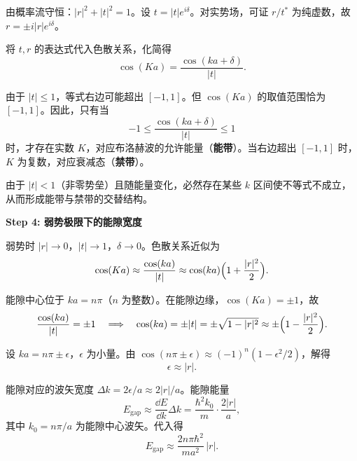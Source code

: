 \begin{derivationbox}[标准解题过程]
由概率流守恒：$|r|^2+|t|^2=1$。设 $t=|t|e^{i\delta}$。对实势场，可证 $r/t^*$ 为纯虚数，故 $r=\pm i|r|e^{i\delta}$。

将 $t,r$ 的表达式代入色散关系，化简得
\begin{equation}
\boxed{\cos(Ka)=\frac{\cos(ka+\delta)}{|t|}.}
\end{equation}

由于 $|t|\le1$，等式右边可能超出 $[-1,1]$。但 $\cos(Ka)$ 的取值范围恰为 $[-1,1]$。因此，只有当
\begin{equation}
-1\le\frac{\cos(ka+\delta)}{|t|}\le 1
\end{equation}
时，才存在实数 $K$，对应布洛赫波的允许能量（\textbf{能带}）。当右边超出 $[-1,1]$ 时，$K$ 为复数，对应衰减态（\textbf{禁带}）。

由于 $|t|<1$（非零势垒）且随能量变化，必然存在某些 $k$ 区间使不等式不成立，从而形成能带与禁带的交替结构。

\textbf{Step 4: 弱势极限下的能隙宽度}

弱势时 $|r|\to0$，$|t|\to1$，$\delta\to0$。色散关系近似为
\begin{equation}
\cos(Ka)\approx\frac{\cos(ka)}{|t|}\approx\cos(ka)\Bigl(1+\frac{|r|^2}{2}\Bigr).
\end{equation}

能隙中心位于 $ka=n\pi$（$n$ 为整数）。在能隙边缘，$\cos(Ka)=\pm1$，故
\begin{equation}
\frac{\cos(ka)}{|t|}=\pm1\quad\Longrightarrow\quad\cos(ka)=\pm|t|=\pm\sqrt{1-|r|^2}\approx\pm\Bigl(1-\frac{|r|^2}{2}\Bigr).
\end{equation}

设 $ka=n\pi\pm\epsilon$，$\epsilon$ 为小量。由 $\cos(n\pi\pm\epsilon)\approx(-1)^n(1-\epsilon^2/2)$，解得
\begin{equation}
\epsilon\approx|r|.
\end{equation}

能隙对应的波矢宽度 $\Delta k=2\epsilon/a\approx2|r|/a$。能隙能量
\begin{equation}
E_{\text{gap}}\approx\frac{\dd E}{\dd k}\Delta k=\frac{\hbar^2k_0}{m}\cdot\frac{2|r|}{a},
\end{equation}
其中 $k_0=n\pi/a$ 为能隙中心波矢。代入得
\begin{equation}
\boxed{E_{\text{gap}}\approx\frac{2n\pi\hbar^2}{ma^2}\,|r|.}
\end{equation}
\end{derivationbox}

